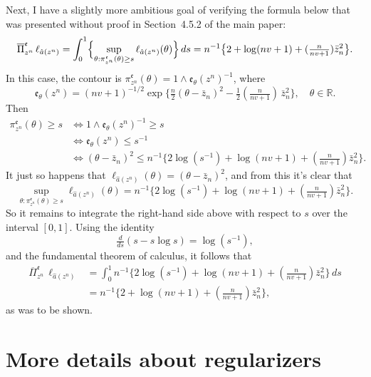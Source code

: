 \documentclass[a4paper, 12pt]{article}
\theoremstyle{plain}
\theoremstyle{definition}
\theoremstyle{remark}
\newcommand{\RR}{\mathbb{R}}
\newcommand{\uPi}{\overline{\Pi}}
\newcommand{\eval}{\mathfrak{e}}
\begin{document}
Next, I have a slightly more ambitious goal of verifying the formula below that was presented without proof in Section~4.5.2 of the main paper:
\begin{align*}
\uPi_{z^n}^{\eval} \, \ell_{\hat a(z^n)} =  \int_0^1 \Bigl\{ \sup_{\theta: \pi_{z^n}^{\eval}(\theta) \geq s} \ell_{\hat a(z^n)}(\theta) \Bigr\} \, ds = n^{-1}\bigl\{ 2 + \log(nv + 1) + (\tfrac{n}{nv+1}) \bar z_n^2 \bigr\}.
\end{align*}
In this case, the contour is $\pi_{z^n}^\eval(\theta) = 1 \wedge \eval_\theta(z^n)^{-1}$, where 
\[ \eval_\theta(z^n) = (nv + 1)^{-1/2} \exp\bigl\{ \tfrac{n}{2} (\theta - \bar z_n)^2 - \tfrac12 ( \tfrac{n}{nv + 1} ) \, \bar z_n^2 \bigr\}, \quad \theta \in \RR. \]
Then 
\begin{align*}
\pi_{z^n}^\eval(\theta) \geq s & \iff 1 \wedge \eval_\theta(z^n)^{-1} \geq s \\
& \iff \eval_\theta(z^n) \leq s^{-1} \\
& \iff (\theta - \bar z_n)^2 \leq n^{-1} \bigl\{ 2\log(s^{-1}) + \log(nv+1) + (\tfrac{n}{nv+1}) \bar z_n^2 \bigr\}.
\end{align*}
It just so happens that $\ell_{\hat a(z^n)}(\theta) = (\theta - \bar z_n)^2$, and from this it's clear that 
\[ \sup_{\theta: \pi_{z^n}^{\eval}(\theta) \geq s} \ell_{\hat a(z^n)}(\theta) = n^{-1} \bigl\{ 2\log(s^{-1}) + \log(nv+1) + (\tfrac{n}{nv+1}) \bar z_n^2 \bigr\}. \]
So it remains to integrate the right-hand side above with respect to $s$ over the interval $[0,1]$.  Using the identity 
\[ \tfrac{d}{ds} (s - s \log s) = \log(s^{-1}), \]
and the fundamental theorem of calculus, it follows that 
\begin{align*}
\uPi_{z^n}^{\eval} \, \ell_{\hat a(z^n)} & = \int_0^1 n^{-1} \bigl\{ 2\log(s^{-1}) + \log(nv+1) + (\tfrac{n}{nv+1}) \bar z_n^2 \bigr\} \, ds \\
& = n^{-1}\bigl\{ 2 + \log(nv + 1) + (\tfrac{n}{nv+1}) \bar z_n^2 \bigr\}, 
\end{align*}
as was to be shown. 


\section{More details about regularizers}
\label{A:other}
\end{document}
